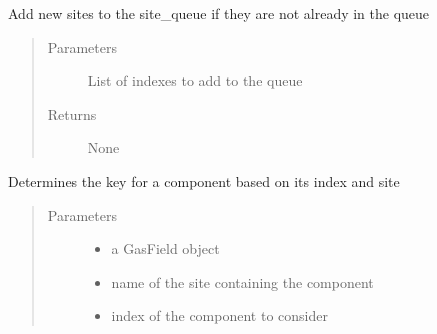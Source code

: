 \documentclass[letterpaper,10pt,english]{sphinxmanual}
\begin{document}
\begin{fulllineitems}

\begin{fulllineitems}
\label{\detokenize{index:feast.DetectionModules.abstract_detection_method.DetectionMethod.extend_site_queue}}
Add new sites to the site\_queue if they are not already in the queue
\begin{quote}\begin{description}
\item[{Parameters}] \leavevmode
{} \textendash{} List of indexes to add to the queue

\item[{Returns}] \leavevmode
None

\end{description}\end{quote}

\end{fulllineitems}


\begin{fulllineitems}
\label{\detokenize{index:feast.DetectionModules.abstract_detection_method.DetectionMethod.find_comp_name}}
Determines the key for a component based on its index and site
\begin{quote}\begin{description}
\item[{Parameters}] \leavevmode\begin{itemize}
\item {} 
 \textendash{} a GasField object

\item {} 
 \textendash{} name of the site containing the component

\item {} 
 \textendash{} index of the component to consider


\end{itemize}
\end{description}
\end{quote}
\end{fulllineitems}
\end{fulllineitems}
\end{document}
